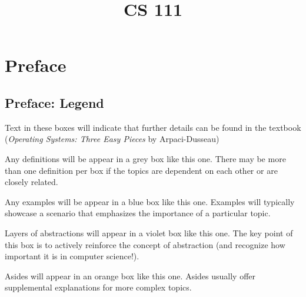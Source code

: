 \documentclass{report}
\title{CS 111}
\date{}
\begin{document}
\maketitle

\tableofcontents
\newpage

\begingroup
\renewcommand\thepart{\Alph{part}.} %
\part{Preface}
\endgroup










\chapter*{Preface: Legend}
\begin{tcolorbox}[colback=black!5!white,colframe=black!75!black,title=\textit{Operating Systems, Three Easy Pieces}]
  Text in these boxes will indicate that further details can be found in the textbook
  (\textit{Operating Systems: Three Easy Pieces} by Arpaci-Dusseau)
\end{tcolorbox}

\begin{tcolorbox}[title=Definitions]
  Any definitions will be appear in a grey box like this one. There may be more than one definition
  per box if the topics are dependent on each other or are closely related.
\end{tcolorbox}

\begin{tcolorbox}[colback=blue!5!white,colframe=black!75!blue,title=Examples]
  Any examples will be appear in a blue box like this one. Examples will typically showcase a scenario
  that emphasizes the importance of a particular topic.
\end{tcolorbox}

\begin{tcolorbox}[colback=violet!5!white,colframe=violet,title=Abstractions] 
  Layers of abstractions will appear in a violet box like this one. The key point of this box is to
  actively reinforce the concept of abstraction (and recognize how important it is in computer science!).
\end{tcolorbox}

\begin{tcolorbox}[colback=orange!5!white,colframe=black!75!orange,title=Asides]
  Asides will appear in an orange box like this one. Asides usually offer supplemental explanations
  for more complex topics.
\end{tcolorbox}
\end{document}
